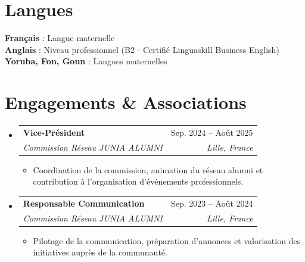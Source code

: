 \documentclass[letterpaper,11pt]{article}
\makeatletter
\newcommand{\resumeItem}[1]{
  \item\small{{#1 \vspace{-1.5pt}}}
}
\newcommand{\resumeSubheading}[4]{
  \vspace{1pt}\item
    \begin{tabular*}{0.97\textwidth}[t]{l@{\extracolsep{\fill}}r}
      {\color{primary}\textbf{#1}} & #2 \\
      \textit{\small#3} & \textit{\small #4} \\
    \end{tabular*}\vspace{-4pt}
}
\newcommand{\resumeSubHeadingListStart}{\begin{itemize}[leftmargin=0.15in, label={}]}
\newcommand{\resumeSubHeadingListEnd}{\end{itemize}}
\newcommand{\resumeItemListStart}{\begin{itemize}[leftmargin=0.15in, label={\small\textbullet}, itemsep=1.5pt, parsep=0pt, topsep=2pt, partopsep=0pt]}
\newcommand{\resumeItemListEnd}{\end{itemize}\vspace{-1pt}}
\makeatother
\begin{document}
\section{Langues}
\begin{itemize}[leftmargin=0.15in, label={}]
  \small{\item{
   \textbf{Français} : Langue maternelle \vspace{1.5pt} \\
   \textbf{Anglais} : Niveau professionnel (B2 - Certifié Linguaskill Business English) \vspace{1.5pt} \\
   \textbf{Yoruba, Fon, Goun} : Langues maternelles
  }}
\end{itemize}

\section{Engagements \& Associations}
\resumeSubHeadingListStart
  \resumeSubheading
    {Vice-Président}{Sep. 2024 -- Août 2025}
    {Commission Réseau JUNIA ALUMNI}{Lille, France}
    \resumeItemListStart
      \resumeItem{Coordination de la commission, animation du réseau alumni et contribution à l'organisation d'événements professionnels.}
    \resumeItemListEnd

  \resumeSubheading
    {Responsable Communication}{Sep. 2023 -- Août 2024}
    {Commission Réseau JUNIA ALUMNI}{Lille, France}
    \resumeItemListStart
      \resumeItem{Pilotage de la communication, préparation d'annonces et valorisation des initiatives auprès de la communauté.}
    \resumeItemListEnd
\resumeSubHeadingListEnd
\end{document}
